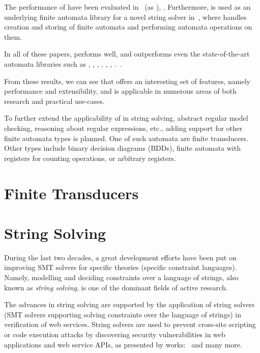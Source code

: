 The performance of \mata have been evaluated in~\cite{cade23_reasoning_regular_properties_comparision_DBLP:conf/cade/FiedorHHRSV23} (as \enfa), \cite{tacas24_mata_10.1007/978-3-031-57249-4_7}.
Furthermore, \mata is used as an underlying finite automata library for a novel string solver \noodler in~\cite{fm23fm23_equations_synergy_regular_constraints_DBLP:conf/fm/BlahoudekCCHHLS23, oopsla23_stabilization_DBLP:journals/pacmpl/ChenCHHLS23,tacas24_noodler_10.1007/978-3-031-57246-3_2}, where \mata handles creation and storing of finite automata and performing automata operations on them.

In all of these papers, \mata performs well, and outperforms even the state-of-the-art automata libraries such as \automatajar, \awali, \vata, \brics, \automatanet, \automatapy, \fado.~\cite{tacas24_mata_10.1007/978-3-031-57249-4_7}.

From these results, we can see that \mata offers an interesting set of features, namely performance and extensibility, and is applicable in numerous areas of both research and practical use-cases.

To further extend the applicability of \mata in string solving, abstract regular model checking, reasoning about regular expressions, etc., adding support for other finite automata types is planned.
One of such automata are finite transducers.
Other types include binary decision diagrams (BDDs), finite automata with registers for counting operations, or arbitrary registers.



\section{Finite Transducers}

\section{String Solving}

During the last two decades, a great development efforts have been put on improving SMT solvers for specific theories (specific constraint languages).
Namely, modelling and deciding constraints over a language of strings, also known as \emph{string solving}, is one of the dominant fields of active research.

The advances in string solving are supported by the application of string solvers (SMT solvers supporting solving constraints over the language of strings) in verification of web services.
String solvers are used to prevent cross-site scripting or code execution attacks by discovering security vulnerabilities in web applications and web service APIs, as presented by works:~\cite{String_constraints_with_concatenation_and_transducers_solved_efficiently, Composing_Static_and_Dynamic_Analysis_to_Validate_Sanitization_in_Web_Applications, Satisfiability_Modulo_Theories_Introduction_and_Applications, Simple_linear_string_constraints,Z3-str_a_z3-based_string_solver_for_web_application_analysis,S3_A_Symbolic_String_Solver_for_Vulnerability_Detection_in_Web_Applications} and many more.

